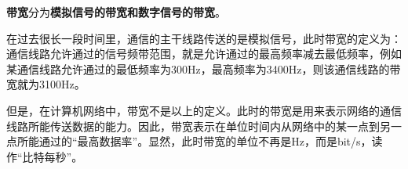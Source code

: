 \textbf{带宽}分为\textbf{模拟信号的带宽和数字信号的带宽}。

在过去很长一段时间里，通信的主干线路传送的是模拟信号，此时带宽的定义为：通信线路允许通过的信号频带范围，就是允许通过的最高频率减去最低频率，例如某通信线路允许通过的最低频率为300Hz，最高频率为3400Hz，则该通信线路的带宽就为3100Hz。

但是，{在计算机网络中，带宽不是以上的定义。此时的带宽是用来表示网络的通信线路所能传送数据的能力。因此，带宽表示在单位时间内从网络中的某一点到另一点所能通过的``最高数据率''。显然，}{此时带宽的单位不再是Hz，而是bit/s，读作``比特每秒''。}
